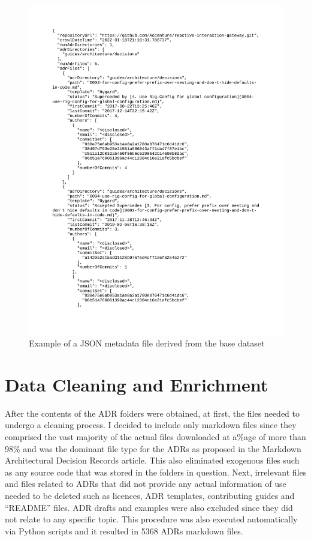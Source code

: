     \begin{figure}
        \centering
        \includegraphics[scale=0.4]{figures/JSON_data_example.png}
        \caption{Example of a JSON metadata file derived from the base dataset}
        \label{fig:JSON_data}
    \end{figure}
    
\section{Data Cleaning and Enrichment}
    After the contents of the ADR folders were obtained, at first, the files needed to undergo a cleaning process. I decided to include only markdown files since they comprised the vast majority of the actual files downloaded at a\%age of more than 98\% and was the dominant file type for the ADRs as proposed in the Markdown Architectural Decision Records \cite{MarkdownADRs} article. This also eliminated exogenous files such as any source code that was stored in the folders in question. Next, irrelevant files and files related to ADRs that did not provide any actual information of use needed to be deleted such as licences, ADR templates, contributing guides and ``README'' files. ADR drafts and examples were also excluded since they did not relate to any specific topic. This procedure was also executed automatically via Python scripts and it resulted in 5368 ADRs markdown files.


